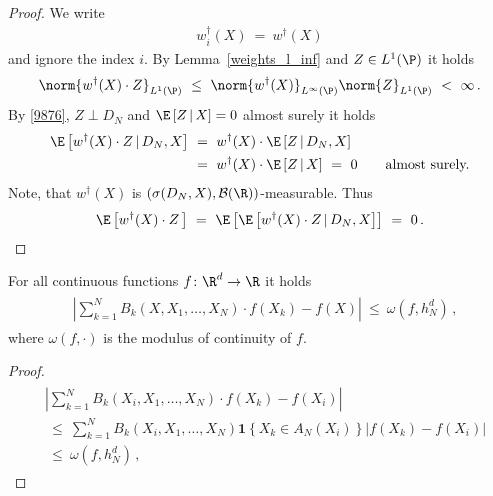 \begin{proof}
  We write
  \begin{gather*}
    w_i^\dagger(X)
  \ 
  =
  \ 
  w^\dagger(X)
  \end{gather*}
  and ignore the index $i$.
  By Lemma~\ref{weights_l_inf} and 
  $Z\in L^1(\P)$
  it holds
  \begin{gather}
    \label{9876}
    \norm{
  w^\dagger(X)\cdot Z
    }_{L^1(\P)}
    \ 
  \le
    \ 
  \norm{w^\dagger(X)}_{L^\infty(\P)}
  \norm{Z}_{L^1(\P)}
  \ 
  <
  \ 
  \infty
  \,.
  \end{gather}
  By 
  \eqref{9876},
  $Z\perp D_N$
  and
  $
\E
\left[
  Z
  \,
  |
  \, 
  X
\right]
= 0
  $
  almost surely
  it holds 
  \begin{align*}
    \E
  \left[
  w^\dagger(X)
  \cdot
  Z
  \,
  |
  \,
  D_N,X
  \right]
  &
  \ 
  =
  \ 
  w^\dagger(X)
  \cdot
  \E
  \left[
  Z
  \,
  |
  \,
  D_N,X
  \right]
  \\
  &
  \ 
  =
  \ 
  w^\dagger(X)
  \cdot
  \E
  \left[
  Z
  \,
  |
  \,
  X
  \right]
  \
  =
  \ 
  0
  \qquad
  \text{almost surely.}
  \end{align*}
  Note, that $w^\dagger(X)$ is 
  $
  \left(
  \sigma(D_N,X),\mathcal{B}(\R)
  \right)
  $-measurable.  
  Thus
  \begin{gather*}
    \E
    \left[
  w^\dagger(X)
  \cdot
  Z
  \,
    \right]
    \ 
    =
    \ 
    \E
    \left[
 \E
  \left[
  w^\dagger(X)
  \cdot
  Z
  \,
  |
  \,
  D_N,X
  \right]
    \right]
    \ 
    =
    \ 
    0
    \,.
     \end{gather*}
\end{proof}

\begin{lemma}
  For all continuous functions $f\colon \R^d\to \R$ it holds
 \begin{align}
   \begin{split}
   &
   \left|
  \sum_{k=1}^{N}
    B_k(X,X_1,\ldots,X_N)\cdot 
    f(X_k)
    -
    f(X)
   \right|
   \ 
   \le
   \ 
   \omega
   \left(
    f,h_N^d
   \right)
   \,,
   \end{split}
 \end{align}
 where $\omega(f,\cdot)$ is the modulus of continuity of $f$. 

\end{lemma}

\begin{proof}
  \begin{align}
   \begin{split}
   &
   \left|
  \sum_{k=1}^{N}
    B_k(X_i,X_1,\ldots,X_N)\cdot 
    f(X_k)
    -
    f(X_i)
   \right|
   \\
   &
   \ 
   \le
   \ 
  \sum_{k=1}^{N}
    B_k(X_i,X_1,\ldots,X_N)
    \mathbf{1}\left\{
      X_k\in A_N(X_i)
    \right\}
    \left|
    f(X_k)
    -
    f(X_i)
    \right|
   \\
   &
   \ 
   \le
   \ 
   \omega
   \left(
    f,h_N^d
   \right)
   \,,
   \end{split}
 \end{align}

\end{proof}

